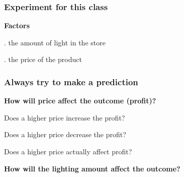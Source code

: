 \documentclass[handout,11pt,aspectratio=169,mathserif]{beamer}
\begin{document}
\begin{frame}\frametitle{Experiment for this class}
	
	{\LARGE\textbf{{\color{purple} Factors}}}
	
	\vspace{24pt}
		. the amount of light in the store
		
	\vspace{12pt}
	
		\pause
		. the price of the product
	
\end{frame}

\begin{frame}\frametitle{Always try to make a prediction}
	
	{\LARGE\textbf{{\color{purple} How will price affect the outcome (profit)?}}}
	\pause
	
	\vspace{24pt}
		\qquad Does a higher price increase the profit?
		\pause
	
	\vspace{12pt}	
		\qquad Does a higher price decrease the profit?
		
		\pause
		
	\vspace{12pt}
		\qquad Does a higher price actually affect profit?
		
		\pause
		
	\vspace{24pt}
	\pause
	
	{\LARGE\textbf{{\color{purple} How will the lighting amount affect the outcome?}}}
\end{frame}

{
\begin{frame}\frametitle{}
\end{frame}}

{
\begin{frame}\frametitle{}
\end{frame}}

{
\begin{frame}\frametitle{}
\end{frame}}
\end{document}
